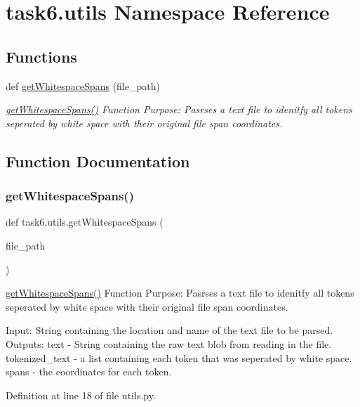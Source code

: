 \hypertarget{namespacetask6_1_1utils}{}\section{task6.\+utils Namespace Reference}
\label{namespacetask6_1_1utils}
\subsection*{Functions}
\begin{DoxyCompactItemize}
\item 
def \hyperlink{namespacetask6_1_1utils_a515e86e4cb66853a491562c4dd7935b1}{get\+Whitespace\+Spans} (file\+\_\+path)
\begin{DoxyCompactList}\small\item\em \hyperlink{namespacetask6_1_1utils_a515e86e4cb66853a491562c4dd7935b1}{get\+Whitespace\+Spans()} Function Purpose\+: Pasrses a text file to idenitfy all tokens seperated by white space with their original file span coordinates. \end{DoxyCompactList}\end{DoxyCompactItemize}


\subsection{Function Documentation}
\mbox{\label{namespacetask6_1_1utils_a515e86e4cb66853a491562c4dd7935b1}} 
\subsubsection{\texorpdfstring{get\+Whitespace\+Spans()}{getWhitespaceSpans()}}
{\footnotesize\ttfamily def task6.\+utils.\+get\+Whitespace\+Spans (\begin{DoxyParamCaption}\item[{}]{file\+\_\+path }\end{DoxyParamCaption})}



\hyperlink{namespacetask6_1_1utils_a515e86e4cb66853a491562c4dd7935b1}{get\+Whitespace\+Spans()} Function Purpose\+: Pasrses a text file to idenitfy all tokens seperated by white space with their original file span coordinates. 

Input\+: String containing the location and name of the text file to be parsed. Outputs\+: text -\/ String containing the raw text blob from reading in the file. tokenized\+\_\+text -\/ a list containing each token that was seperated by white space. spans -\/ the coordinates for each token. 

Definition at line 18 of file utils.\+py.


